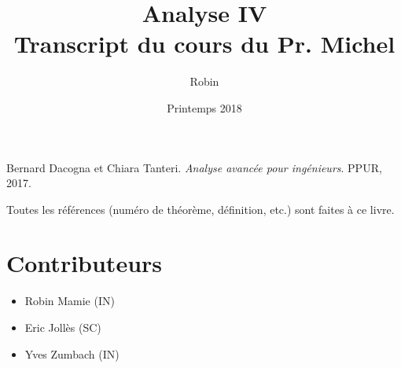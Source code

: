 \documentclass[a4paper, 11pt]{report}
\title{\textbf{Analyse IV} \\
Transcript du cours du Pr. Michel \bsc{Cibils}}
\author{Robin \bsc{Mamié}}
\date{Printemps 2018}
\theoremstyle{definition}
\theoremstyle{remark}
\begin{document}
\maketitle

\tableofcontents







\begin{thebibliography}{9}
    Bernard Dacogna et Chiara Tanteri. 
    \textit{Analyse avancée pour ingénieurs}. 
    PPUR, 2017.
\end{thebibliography}

Toutes les références (numéro de théorème, définition, etc.) sont faites à ce livre.


\section*{Contributeurs}

\begin{itemize}
    \item Robin Mamie (IN)
    \item Eric Jollès (SC)
    \item Yves Zumbach (IN)
\end{itemize}
\end{document}
